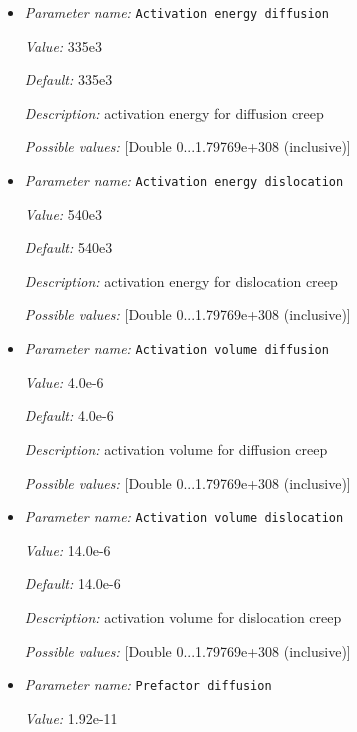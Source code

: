 \begin{itemize}
\item {\it Parameter name:} {\tt Activation energy diffusion}


{\it Value:} 335e3


{\it Default:} 335e3


{\it Description:} activation energy for diffusion creep


{\it Possible values:} [Double 0...1.79769e+308 (inclusive)]
\item {\it Parameter name:} {\tt Activation energy dislocation}


{\it Value:} 540e3


{\it Default:} 540e3


{\it Description:} activation energy for dislocation creep


{\it Possible values:} [Double 0...1.79769e+308 (inclusive)]
\item {\it Parameter name:} {\tt Activation volume diffusion}


{\it Value:} 4.0e-6


{\it Default:} 4.0e-6


{\it Description:} activation volume for diffusion creep


{\it Possible values:} [Double 0...1.79769e+308 (inclusive)]
\item {\it Parameter name:} {\tt Activation volume dislocation}


{\it Value:} 14.0e-6


{\it Default:} 14.0e-6


{\it Description:} activation volume for dislocation creep


{\it Possible values:} [Double 0...1.79769e+308 (inclusive)]
\item {\it Parameter name:} {\tt Prefactor diffusion}


{\it Value:} 1.92e-11



\end{itemize}
